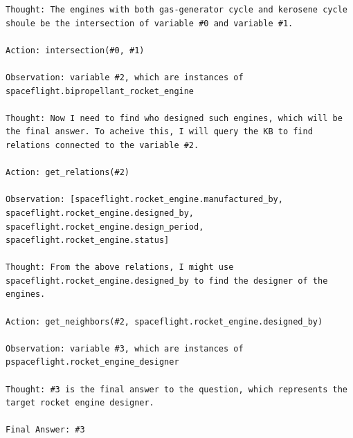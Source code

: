 \begin{lstlisting}
Thought: The engines with both gas-generator cycle and kerosene cycle shoule be the intersection of variable #0 and variable #1.

Action: intersection(#0, #1)

Observation: variable #2, which are instances of spaceflight.bipropellant_rocket_engine

Thought: Now I need to find who designed such engines, which will be the final answer. To acheive this, I will query the KB to find relations connected to the variable #2.

Action: get_relations(#2)

Observation: [spaceflight.rocket_engine.manufactured_by, spaceflight.rocket_engine.designed_by, spaceflight.rocket_engine.design_period, spaceflight.rocket_engine.status]

Thought: From the above relations, I might use spaceflight.rocket_engine.designed_by to find the designer of the engines.

Action: get_neighbors(#2, spaceflight.rocket_engine.designed_by)

Observation: variable #3, which are instances of pspaceflight.rocket_engine_designer

Thought: #3 is the final answer to the question, which represents the target rocket engine designer.

Final Answer: #3
\end{lstlisting}